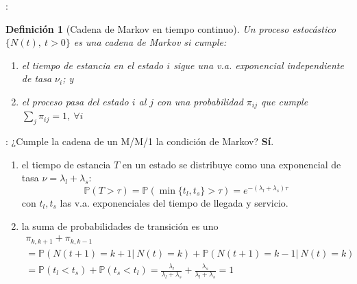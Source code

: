 \documentclass[xcolor={x11names}]{beamer}
\newtheorem{definicion}{Definición}[section]
\begin{document}
\begin{frame}{\secname: \subsecname}
    \begin{definicion}[Cadena de Markov en tiempo continuo\cite{amable}]
        Un proceso estocástico
        $\{N(t),\ t>0\}$ es una cadena de Markov
        si cumple:
        \begin{enumerate}
            \item el tiempo de estancia
                en el estado $i$ sigue
                una v.a. exponencial
                independiente de tasa $\nu_i$; y
            \item el proceso pasa del estado
                $i$ al $j$ con una
                probabilidad $\pi_{ij}$
                que cumple
                $\sum_j \pi_{ij} = 1,\ \forall i$
        \end{enumerate}
    \end{definicion}
\end{frame}




\begin{frame}{\secname: \subsecname}
    ¿Cumple la cadena de un M/M/1 la condición
    de Markov? \pause \textbf{Sí}.

    \vfill

    \begin{enumerate}
        \item el tiempo de estancia $T$ en un
            estado se distribuye como una
            exponencial de tasa
            $\nu=\lambda_l+\lambda_s$:
            \begin{equation*}
                \mathbb{P}(T>\tau)=\mathbb{P}(\min\{t_l,t_s\}>\tau)=e^{-(\lambda_l+\lambda_s)\tau}
            \end{equation*}
            con $t_l,t_s$ las v.a.
            exponenciales del tiempo de
            llegada y servicio.

        \item la suma de probabilidades
            de transición es uno
            \begin{multline*}
                \pi_{k,k+1}+\pi_{k,k-1}\\
                =\mathbb{P}(N(t+1)=k+1|\ N(t)=k)
                + \mathbb{P}(N(t+1)=k-1|\ N(t)=k)\\
                = \mathbb{P}(t_l<t_s)
                + \mathbb{P}(t_s<t_l)
                = \frac{\lambda_l}{\lambda_l+\lambda_s}
                + \frac{\lambda_s}{\lambda_l+\lambda_s} = 1
            \end{multline*}
    \end{enumerate}

\end{frame}
\end{document}

